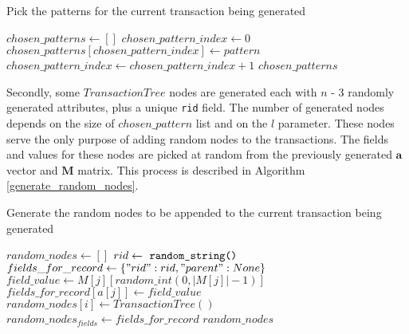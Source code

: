 \documentclass{acm_proc_article-sp-sigmod09}
\begin{document}
\begin{algorithm}
\caption{Pick the patterns for the current transaction being generated}
\label{pick_patterns}
\begin{algorithmic}[1]
\State $chosen\_patterns \gets []$
\State $chosen\_pattern\_index \gets 0$
            \State $chosen\_patterns[chosen\_pattern\_index] \gets pattern$
            \State $chosen\_pattern\_index \gets chosen\_pattern\_index + 1$
        \EndIf
    \EndFor
\EndFor
\Return $chosen\_patterns$
\EndFunction
\end{algorithmic}
\end{algorithm}

Secondly, some $TransactionTree$ nodes are generated each with $n$ - 3 randomly generated attributes, plus a unique \texttt{rid} field. The number of generated nodes depends on the size of $chosen\_pattern$ list and on the $l$ parameter. These nodes serve the only purpose of adding random nodes to the transactions. The fields and values for these nodes are picked at random from the previously generated $\boldsymbol{a}$ vector and $\boldsymbol{M}$ matrix. This process is described in Algorithm \ref{generate_random_nodes}.

\begin{algorithm}
\caption{Generate the random nodes to be appended to the current transaction being generated}
\label{generate_random_nodes}
\begin{algorithmic}[1]
\State $random\_nodes \gets []$
    \State $rid \gets \text{ \texttt{random\_string() }}$
    \State $fields\_for\_record \gets \{"rid": rid, "parent": None\}$
        \State $field\_value \gets M[j][random\_int(0, |M[j]| - 1)]$
        \State $fields\_for\_record[a[j]] \gets field\_value$
    \EndFor
    \State $random\_nodes[i] \gets TransactionTree()$
    \State $random\_nodes_{fields} \gets fields\_for\_record$
\EndFor
\Return $random\_nodes$
\EndFunction
\end{algorithmic}
\end{algorithm}
\end{document}
